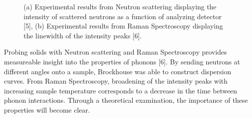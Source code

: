 \documentclass{article}
\numberwithin{equation}{section}
\begin{document}
\begin{figure}[ht]
\centering
{}
\label{fig:subfigureExample}
\caption[Optional caption for list of figures]{(a) Experimental results from Neutron scattering displaying the intensity of scattered neutrons as a function of analyzing detector [5], (b) Experimental results from Raman Spectroscopy displaying the linewidth of the intensity peaks [6].}
\end{figure}

Probing solids with Neutron scattering and Raman Spectroscopy provides measureable insight into the properties of phonons [6]. By sending neutrons at different angles onto a sample, Brockhouse was able to construct dispersion curves. From Raman Spectroscopy, broadening of the intensity peaks with increasing sample temperature corresponds to a decrease in the time between phonon interactions. Through a theoretical examination, the importance of these properties will become clear.
\end{document}
